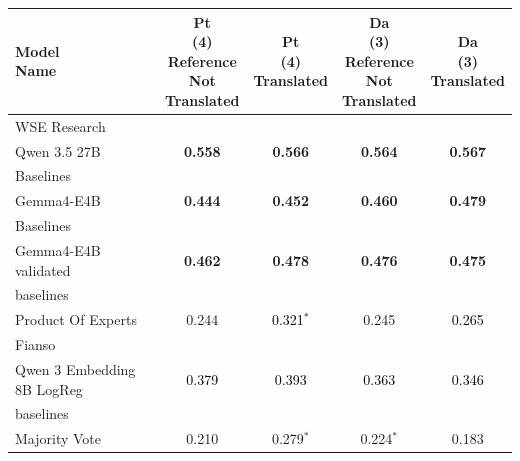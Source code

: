 \begin{tabularx}{\textwidth}{X | c c c c}
\hline
\makecell[b]{\textbf{Model} \\ \textbf{Name}} & \makecell[b]{\textbf{Pt} \\ \textbf{(4)} \\ \textbf{Reference} \\ \textbf{Not} \\ \textbf{Translated}} & \makecell[b]{\textbf{Pt} \\ \textbf{(4)} \\ \textbf{Translated}} & \makecell[b]{\textbf{Da} \\ \textbf{(3)} \\ \textbf{Reference} \\ \textbf{Not} \\ \textbf{Translated}} & \makecell[b]{\textbf{Da} \\ \textbf{(3)} \\ \textbf{Translated}} \\
\hline
WSE Research\\\subcatarrow{}Qwen 3.5 27B & \textbf{\textcolor{BrickRed}{0.558}} & \textbf{\textcolor{BrickRed}{0.566}} & \textbf{\textcolor{BrickRed}{0.564}} & \textbf{\textcolor{BrickRed}{0.567}} \\
Baselines\\\subcatarrow{}Gemma4-E4B & \textbf{\textcolor{White!50!BrickRed}{0.444}} & \textbf{\textcolor{White!50!BrickRed}{0.452}} & \textbf{\textcolor{White!50!BrickRed}{0.460}} & \textbf{\textcolor{White!50!BrickRed}{0.479}} \\
Baselines\\\subcatarrow{}Gemma4-E4B validated & \textbf{\textcolor{White!50!BrickRed}{0.462}} & \textbf{\textcolor{White!50!BrickRed}{0.478}} & \textbf{\textcolor{White!50!BrickRed}{0.476}} & \textbf{\textcolor{White!50!BrickRed}{0.475}} \\
baselines\\\subcatarrow{}Product Of Experts & \textcolor{White!50!NavyBlue}{0.244} & \textcolor{Black}{0.321$^{*}$} & \textcolor{White!50!NavyBlue}{0.245} & \textcolor{Black}{0.265} \\
Fianso\\\subcatarrow{}Qwen 3 Embedding 8B LogReg & \textcolor{Black}{0.379} & \textcolor{Black}{0.393} & \textcolor{Black}{0.363} & \textcolor{Black}{0.346} \\
baselines\\\subcatarrow{}Majority Vote & \textcolor{White!50!NavyBlue}{0.210} & \textcolor{White!50!NavyBlue}{0.279$^{*}$} & \textcolor{White!50!NavyBlue}{0.224$^{*}$} & \textcolor{White!50!NavyBlue}{0.183} \\

\end{tabularx}
